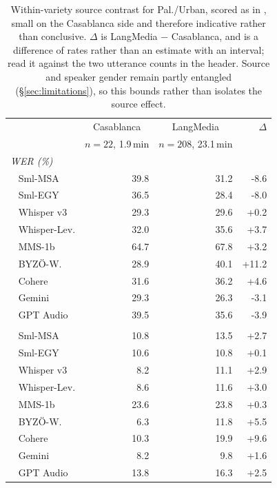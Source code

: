 \begin{table}[t]
\centering
\small
\setlength{\tabcolsep}{4pt}
\begin{tabular*}{\columnwidth}{@{\extracolsep{\fill}}l rr r@{}}
\toprule
& \multicolumn{1}{c}{Casablanca} & \multicolumn{1}{c}{LangMedia} & $\Delta$ \\
& \multicolumn{1}{c}{\scriptsize $n=22$, 1.9\,min} & \multicolumn{1}{c}{\scriptsize $n=208$, 23.1\,min} & \\
\midrule
\multicolumn{4}{l}{\textit{WER (\%)}} \\
\addlinespace[2pt]
~ Sml-MSA & 39.8 & 31.2 & -8.6 \\
~ Sml-EGY & 36.5 & 28.4 & -8.0 \\
~ Whisper v3 & 29.3 & 29.6 & +0.2 \\
~ Whisper-Lev. & 32.0 & 35.6 & +3.7 \\
~ MMS-1b & 64.7 & 67.8 & +3.2 \\
~ BYZÖ-W. & 28.9 & 40.1 & +11.2 \\
~ Cohere & 31.6 & 36.2 & +4.6 \\
~ Gemini & 29.3 & 26.3 & -3.1 \\
~ GPT Audio & 39.5 & 35.6 & -3.9 \\
\addlinespace[2pt]\midrule\addlinespace[2pt]
\multicolumn{4}{l}{\textit{CER (\%)}} \\
\addlinespace[2pt]
~ Sml-MSA & 10.8 & 13.5 & +2.7 \\
~ Sml-EGY & 10.6 & 10.8 & +0.1 \\
~ Whisper v3 & 8.2 & 11.1 & +2.9 \\
~ Whisper-Lev. & 8.6 & 11.6 & +3.0 \\
~ MMS-1b & 23.6 & 23.8 & +0.3 \\
~ BYZÖ-W. & 6.3 & 11.8 & +5.5 \\
~ Cohere & 10.3 & 19.9 & +9.6 \\
~ Gemini & 8.2 & 9.8 & +1.6 \\
~ GPT Audio & 13.8 & 16.3 & +2.5 \\
\bottomrule
\end{tabular*}
\caption{Within-variety source contrast for Pal./Urban, scored as in , small on the Casablanca side and therefore indicative rather than conclusive. $\Delta$ is LangMedia $-$ Casablanca, and is a difference of rates rather than an estimate with an interval; read it against the two utterance counts in the header. Source and speaker gender remain partly entangled (\S\ref{sec:limitations}), so this bounds rather than isolates the source effect.}
\label{tab:asr-source-urban}
\end{table}
